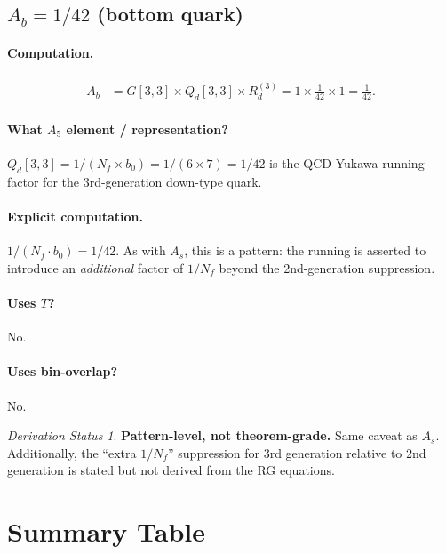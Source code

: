 \documentclass[11pt]{article}
\theoremstyle{remark}
\newtheorem*{status}{Derivation Status}
\begin{document}
\subsection{$A_b = 1/42$ \quad (bottom quark)}

\paragraph{Computation.}
\begin{align}
A_b &= G[3,3] \times Q_d[3,3] \times R_d^{(3)} = 1 \times \frac{1}{42} \times 1 = \frac{1}{42}.
\end{align}

\paragraph{What $A_5$ element / representation?}
$Q_d[3,3] = 1/(N_f \times b_0) = 1/(6 \times 7) = 1/42$ is the QCD Yukawa running factor for the 3rd-generation down-type quark.

\paragraph{Explicit computation.}
$1/(N_f \cdot b_0) = 1/42$.
As with $A_s$, this is a pattern: the running is asserted to introduce an \emph{additional} factor of $1/N_f$ beyond the 2nd-generation suppression.

\paragraph{Uses $T$?} No.
\paragraph{Uses bin-overlap?} No.

\begin{status}
\textbf{Pattern-level, not theorem-grade.}
Same caveat as $A_s$.
Additionally, the ``extra $1/N_f$'' suppression for 3rd generation relative to 2nd generation is stated but not derived from the RG equations.
\end{status}

\section{Summary Table}
\end{document}
